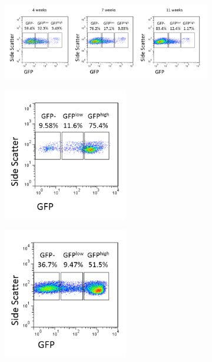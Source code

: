 \begin{figure}
	\begin{subfigure}{\textwidth}
	\caption{}
	\includegraphics[width=\textwidth]{Figures/RAGhighlownegthyB.png}	
	\label{subfig:RAGhighlownegthyB}
	\end{subfigure}
	\begin{subfigure}{0.5\textwidth}
	\centering
	\caption{}
	\includegraphics[width=0.6\textwidth]{Figures/7wkBMRAG.png}	
	\label{subfig:BMRAG}	
	\end{subfigure}
	\begin{subfigure}{0.5\textwidth}
	\centering
	\caption{}
	\includegraphics[width=0.6\textwidth]{Figures/7wktotalthyRAG.png}

\end{subfigure}
\end{figure}
